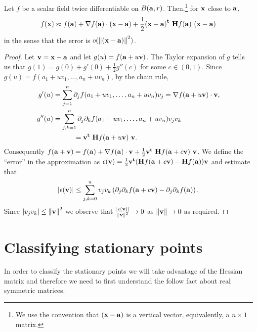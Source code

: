 \begin{theorem}
    Let \(f\) be a scalar field twice differentiable on \(B(\aa,r)\).
    Then,\footnote{We use the convention that \((\xx-\aa)\) is a vertical vector, equivalently, a \(n \times 1\) matrix.} for \(\xx\) close to \(\aa\),
    \[
        f(\xx) \approx f(\aa) + \nabla f(\aa) \cdot (\xx-\aa) + \frac{1}{2} {(\xx-\aa)}^{\mathbf{t}} \ \mathbf{H} f (\aa) \ (\xx-\aa)
    \]
    in the sense that the error is \(\littleo{\norm{(\xx-\aa)}^2}\).
\end{theorem}

\begin{proof}
    Let \(\vv = \xx-\aa\) and let \(g(u) = f(\aa + u \vv)\).
    The Taylor expansion of \(g\) tells us that
    \(g(1) = g(0) + g'(0) + \frac{1}{2} g''(c)\) for some \(c\in (0,1)\).
    Since \(g(u) = f(a_1 + uv_1, \ldots, a_n + u v_n)\), by the chain rule,
    \[
        \begin{aligned}
            g'(u)  & = \sum_{j=1}^{n} \partial_j f( a_1 + uv_1, \ldots, a_n + u v_n ) v_j
            =\nabla f( \aa + u \vv) \cdot \vv,                                                            \\
            g''(u) & = \sum_{j,k=1}^{n} \partial_j\partial_k f( a_1 + uv_1, \ldots, a_n + u v_n ) v_j v_k \\
                   & \quad \quad \quad
            =  \vv^{\mathbf{t}} \ \mathbf{H} f (\aa + u \vv) \ \vv.
        \end{aligned}
    \]
    Consequently
    \(
    f(\aa+\vv) = f(\aa) + \nabla f(\aa) \cdot \vv + \frac{1}{2} \vv^{\mathbf{t}} \ \mathbf{H} f (\aa + c\vv) \ \vv
    \).
    We define the ``error'' in the approximation as \(\epsilon(\vv) = \frac{1}{2}  \vv^{\mathbf{t}} (\mathbf{H} f (\aa + c\vv) - \mathbf{H} f (\aa)  ) \vv\)
    and estimate that
    \[
        \abs{\epsilon(\vv)} \leq \sum_{j,k=0}^{n}
        v_j v_k \left( \partial_{j}\partial_{k}f(\aa+c\vv)-\partial_{j}\partial_{k}f(\aa) \right).
    \]
    Since \(\abs{ v_j v_k} \leq \norm{\vv}^2\) we observe that \(\frac{\abs{\epsilon(\vv)} }{\norm{\vv}^2} \to 0\) as \(\norm{\vv} \to 0\) as required.
\end{proof}


\section{Classifying stationary points}

In order to classify the stationary points we will take advantage of the Hessian matrix and therefore we need to first understand the follow fact about real symmetric matrices.

